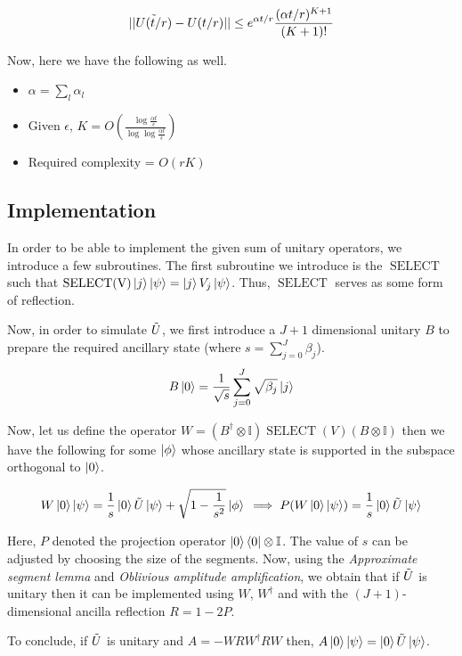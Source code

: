\documentclass[
10pt, %
a4paper, %
oneside, %
headinclude,footinclude, %
BCOR5mm, %
]{scrartcl}
\begin{document}
$$||\Tilde{U(t/r)} - U(t/r)|| \leq e^{\alpha t /r} \frac{(\alpha t/r)^{K + 1}}{(K + 1)!}$$

Now, here we have the following as well.
\begin{itemize}
    \item $\alpha = \sum_l \alpha_l$
    \item Given $\epsilon$, $K = O\left(\frac{\log\frac{\alpha t}{\epsilon}}{\log\log \frac{\alpha t}{\epsilon}}\right)$
    \item Required complexity = $O(rK)$
\end{itemize}

\subsection{Implementation}
In order to be able to implement the given sum of unitary operators, we introduce a few subroutines. The first subroutine we introduce is the $\operatorname{SELECT}$ such that $\operatorname{SELECT(V)}\ket{j}\ket{\psi} = \ket{j}V_j\ket{\psi}$. Thus, $\operatorname{SELECT}$ serves as some form of reflection.\newline

Now, in order to simulate $\Tilde{U}$, we first introduce a $J + 1$ dimensional unitary $B$ to prepare the required ancillary state (where $s = \sum_{j = 0}^{J}\beta_j$).
$$B \ket{0} = \frac{1}{\sqrt s} \sum_{j = 0}^{J} \sqrt{\beta_j}\ket{j}$$

Now, let us define the operator $W = (B^{\dagger}\otimes \mathbb{I})\operatorname{SELECT}(V)(B \otimes \mathbb{I})$ then we have the following for some $\ket{\phi}$ whose ancillary state is supported in the subspace orthogonal to $\ket{0}$.

$$W\ket{0}\ket{\psi} = \frac{1}{s} \ket{0} \Tilde{U}\ket{\psi} + \sqrt{1 - \frac{1}{s^2}}\ket{\phi}\\
\implies P(W\ket{0}\ket{\psi}) = \frac{1}{s} \ket{0} \Tilde{U}\ket{\psi}$$

Here, $P$ denoted the projection operator $\ket{0}\bra{0}\otimes \mathbb{I}$. The value of $s$ can be adjusted by choosing the size of the segments. Now, using the \textit{Approximate segment lemma} and \textit{Oblivious amplitude amplification}, we obtain that if $\Tilde{U}$ is unitary then it can be implemented using $W$, $W^\dagger$ and with the $(J + 1)$-dimensional ancilla reflection $R = 1 - 2P$.\newline

To conclude, if $\Tilde{U}$ is unitary and $A = -WRW^\dagger RW$ then, $A\ket{0}\ket{\psi} = \ket{0}\Tilde{U}\ket{\psi}$.
\end{document}

